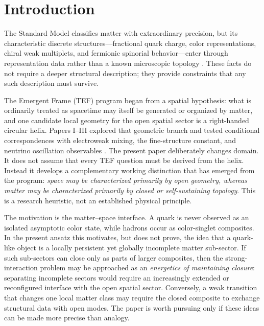 \documentclass[aps,prd,reprint,superscriptaddress,nofootinbib,longbibliography,floatfix]{revtex4-2}
\newcommand{\TEF}{\textsc{TEF}}
\begin{document}
\maketitle

\section{Introduction}

The Standard Model classifies matter with extraordinary precision, but its characteristic discrete structures---fractional quark charge, color representations, chiral weak multiplets, and fermionic spinorial behavior---enter through representation data rather than a known microscopic topology \cite{PDG2026}. These facts do not require a deeper structural description; they provide constraints that any such description must survive.

The Emergent Frame (\TEF{}) program began from a spatial hypothesis: what is ordinarily treated as spacetime may itself be generated or organized by matter, and one candidate local geometry for the open spatial sector is a right-handed circular helix. Papers I--III explored that geometric branch and tested conditional correspondences with electroweak mixing, the fine-structure constant, and neutrino oscillation observables \cite{WuI,WuII,WuIII}. The present paper deliberately changes domain. It does not assume that every TEF question must be derived from the helix. Instead it develops a complementary working distinction that has emerged from the program: \emph{space may be characterized primarily by open geometry, whereas matter may be characterized primarily by closed or self-sustaining topology}. This is a research heuristic, not an established physical principle.

The motivation is the matter--space interface. A quark is never observed as an isolated asymptotic color state, while hadrons occur as color-singlet composites. In the present ansatz this motivates, but does not prove, the idea that a quark-like object is a locally persistent yet globally incomplete matter sub-sector. If such sub-sectors can close only as parts of larger composites, then the strong-interaction problem may be approached as an \emph{energetics of maintaining closure}: separating incomplete sectors would require an increasingly extended or reconfigured interface with the open spatial sector. Conversely, a weak transition that changes one local matter class may require the closed composite to exchange structural data with open modes. The paper is worth pursuing only if these ideas can be made more precise than analogy.
\end{document}
